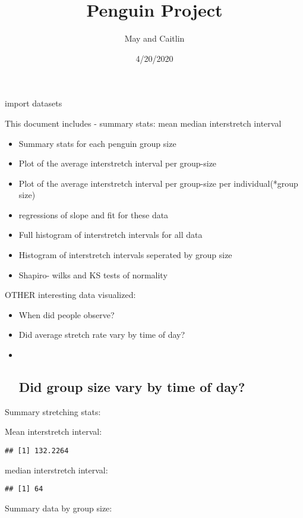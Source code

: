 \documentclass[]{article}
\title{Penguin Project}
\author{May and Caitlin}
\date{4/20/2020}
\begin{document}
\maketitle

import datasets

This document includes - summary stats: mean median interstretch
interval

\begin{itemize}
\item
  Summary stats for each penguin group size
\item
  Plot of the average interstretch interval per group-size
\item
  Plot of the average interstretch interval per group-size per
  individual(*group size)
\item
  regressions of slope and fit for these data
\item
  Full histogram of interstretch intervals for all data
\item
  Histogram of interstretch intervals seperated by group size
\item
  Shapiro- wilks and KS tests of normality
\end{itemize}

OTHER interesting data visualized:

\begin{itemize}
\item
  When did people observe?
\item
  Did average stretch rate vary by time of day?
\item ~
  \hypertarget{did-group-size-vary-by-time-of-day}{%
  \subsection{Did group size vary by time of
  day?}\label{did-group-size-vary-by-time-of-day}}
\end{itemize}

Summary stretching stats:

Mean interstretch interval:

\begin{verbatim}
## [1] 132.2264
\end{verbatim}

median interstretch interval:

\begin{verbatim}
## [1] 64
\end{verbatim}

Summary data by group size:
\end{document}

